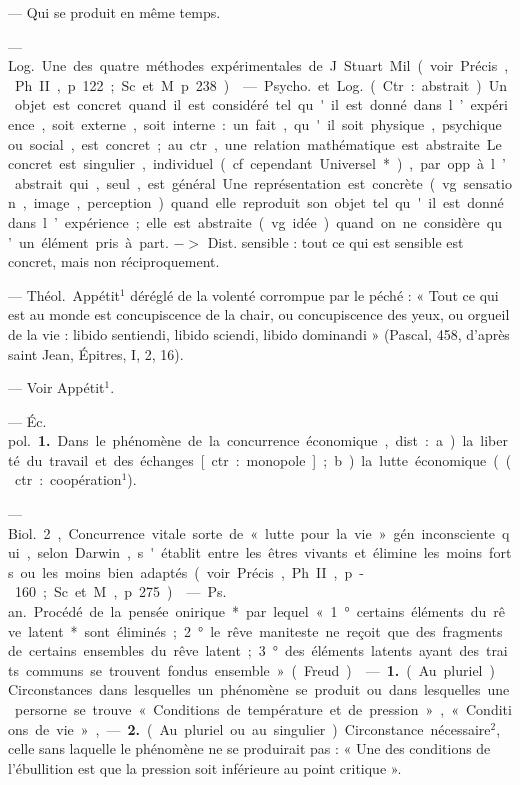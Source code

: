 \begin{itemize}[leftmargin=1cm, label=, itemsep=11pt]
 — Qui se produit en
même temps.

 — \si{Log.}
Une des quatre méthodes expérimentales de J. Stuart Mil (voir
Précis, Ph. II, p. 122; Sc. et M.
p. 238).

 — \si{Psycho.} et \si{Log.} (Ctr. :
abstrait). Un objet est concret quand
il est considéré tel qu'il est donné
dans l’expérience, soit externe, soit
interne : un fait, qu'il soit physique,
psychique ou social, est concret; au
ctr., une relation mathématique est
abstraite. Le concret est singulier,
individuel (cf. cependant Universel*),
par opp. à l’abstrait qui, seul, est
général. Une représentation est concrète (vg. sensation, image, perception) quand elle reproduit son
objet tel qu'il est donné dans l’expérience; elle est abstraite (vg. idée)
quand on ne considère qu’un élément pris à part. $->$ Dist. sensible : tout ce qui est sensible est
concret, mais non réciproquement.

 — \si{Théol.} Appétit$^1$ déréglé de la volenté corrompue par
le péché : « Tout ce qui est au
monde est concupiscence de la chair,
ou concupiscence des yeux, ou
orgueil de la vie : libido sentiendi,
libido sciendi, libido dominandi »
(Pascal, 458, d’après saint Jean,
Épitres, I, 2, 16).

 — Voir Appétit$^1$.

 — \si{Éc. pol.} {\bf 1.} Dans le
phénomène de la concurrence économique, dist. : a) la liberté du travail
et des échanges [ctr. : monopole];
b) la lutte économique ((ctr. : coopération$^1$).

— \si{Biol.} 2, Concurrence vitale
sorte de « lutte pour la vie » gén.
inconsciente qui, selon Darwin,
s'établit entre les êtres vivants et
élimine les moins forts ou les moins
bien adaptés (voir Précis, Ph. II,
p- 160; Sc. et M., p. 275).

 — \si{Ps. an.} Procédé de
la pensée onirique* par lequel
« 1° certains éléments du rêve latent*
sont éliminés; 2° le rêve maniteste
ne reçoit que des fragments de certains ensembles du rêve latent;
3° des éléments latents ayant des
traits communs se trouvent fondus
ensemble » (Freud).

 — {\bf 1.} (Au pluriel). Circonstances dans lesquelles un phénomène se produit ou dans lesquelles une persorne se trouve
« Conditions de température et de
pression », « Conditions de vie », —
 {\bf 2.} (Au pluriel ou au singulier). Circonstance nécessaire$^2$, celle sans
laquelle le phénomène ne se produirait
pas : « Une des conditions de
l'ébullition est que la pression soit
inférieure au point critique ».


\end{itemize}
